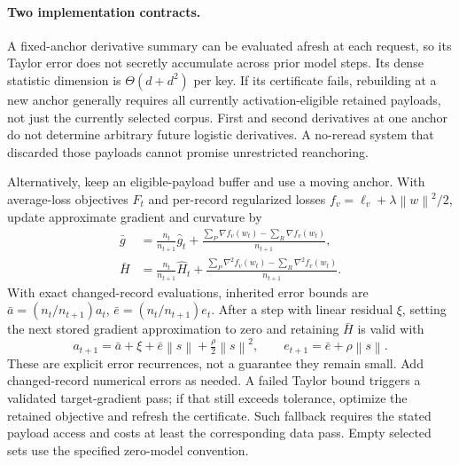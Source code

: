 \documentclass[11pt,a4paper]{article}
\theoremstyle{definition}\newtheorem{definition}[theorem]{Definition}
\newcommand{\norm}[1]{\left\lVert #1\right\rVert}
\begin{document}
\paragraph{Two implementation contracts.} A fixed-anchor derivative summary can be evaluated afresh at each request, so its Taylor error does not secretly accumulate across prior model steps. Its dense statistic dimension is $\Theta(d+d^2)$ per key. If its certificate fails, rebuilding at a new anchor generally requires all currently activation-eligible retained payloads, not just the currently selected corpus. First and second derivatives at one anchor do not determine arbitrary future logistic derivatives. A no-reread system that discarded those payloads cannot promise unrestricted reanchoring.

Alternatively, keep an eligible-payload buffer and use a moving anchor. With average-loss objectives $F_t$ and per-record regularized losses $f_v=\ell_v+\lambda\norm w^2/2$, update approximate gradient and curvature by
\begin{align*}
 \bar g&=\frac{n_t}{n_{t+1}}\widehat g_t+
 \frac{\sum_{P}\nabla f_v(w_t)-\sum_R\nabla f_v(w_t)}{n_{t+1}},\\
 \bar H&=\frac{n_t}{n_{t+1}}\widehat H_t+
 \frac{\sum_{P}\nabla^2 f_v(w_t)-\sum_R\nabla^2 f_v(w_t)}{n_{t+1}}.
\end{align*}
With exact changed-record evaluations, inherited error bounds are $\bar a=(n_t/n_{t+1})a_t$, $\bar e=(n_t/n_{t+1})e_t$. After a step with linear residual $\xi$, setting the next stored gradient approximation to zero and retaining $\bar H$ is valid with
\[
 a_{t+1}=\bar a+\xi+\bar e\norm s+\tfrac\rho2\norm{s}^2,
 \qquad e_{t+1}=\bar e+\rho\norm s.
\]
These are explicit error recurrences, not a guarantee they remain small. Add changed-record numerical errors as needed. A failed Taylor bound triggers a validated target-gradient pass; if that still exceeds tolerance, optimize the retained objective and refresh the certificate. Such fallback requires the stated payload access and costs at least the corresponding data pass. Empty selected sets use the specified zero-model convention.
\end{document}
